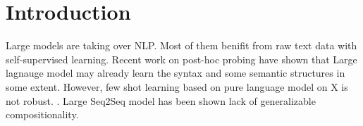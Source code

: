
\chapter{Introduction}
\label{chap:intro}

Large models are taking over NLP. Most of them
benifit from raw text data with self-supervised
learning.  Recent work on post-hoc probing have shown
that Large lagnauge model may already learn the syntax and some
semantic structures in some extent. However, few shot learning based
on pure language model on X is not robust. . Large Seq2Seq model has been shown lack of
generalizable compositionality. 


%
%
%
%

